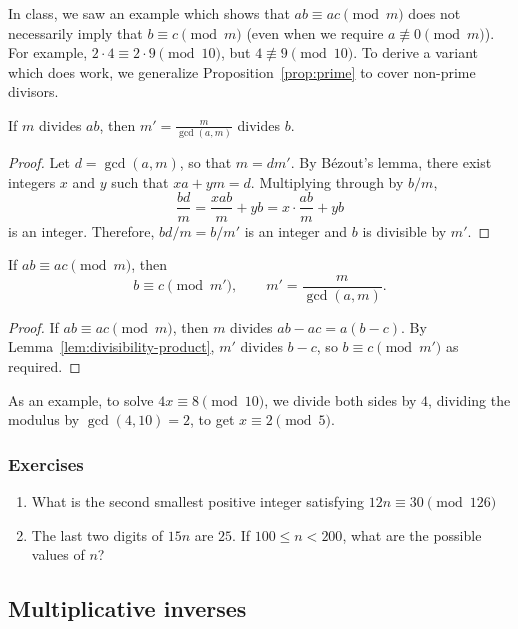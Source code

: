 In class, we saw an example which shows that $ab\equiv ac\pmod{m}$ does not necessarily imply that $b\equiv c\pmod{m}$ (even when we require $a\not\equiv 0\pmod{m}$). For example, $2\cdot 4\equiv 2\cdot 9\pmod{10}$, but $4\not\equiv 9\pmod{10}$. To derive a variant which does work, we generalize Proposition~\ref{prop:prime} to cover non-prime divisors.

\begin{lemma}\label{lem:divisibility-product}
If $m$ divides $ab$, then $m' = \frac{m}{\gcd(a,m)}$ divides $b$.
\end{lemma}
\begin{proof}
Let $d = \gcd(a,m)$, so that $m = dm'$. By B\'{e}zout's lemma, there exist integers $x$ and $y$ such that $xa + ym = d$. Multiplying through by $b/m$,
\begin{equation*}
\frac{bd}{m} = \frac{xab}{m} + yb = x\cdot\frac{ab}{m} + yb
\end{equation*}
is an integer. Therefore, $bd/m = b/m'$ is an integer and $b$ is divisible by $m'$.
\end{proof}

\begin{proposition}\label{prop:mod-arith-divide}
If $ab\equiv ac\pmod{m}$, then
\begin{equation*}
b\equiv c\pmod{m'},\qquad m' = \frac{m}{\gcd(a,m)}.
\end{equation*}
\end{proposition}
\begin{proof}
If $ab\equiv ac\pmod{m}$, then $m$ divides $ab - ac = a(b - c)$. By Lemma~\ref{lem:divisibility-product}, $m'$ divides $b - c$, so $b\equiv c\pmod{m'}$ as required.
\end{proof}

As an example, to solve $4x\equiv 8\pmod{10}$, we divide both sides by $4$, dividing the modulus by $\gcd(4,10) = 2$, to get $\boxed{x\equiv 2\pmod{5}}$.

\subsubsection*{Exercises}

\begin{enumerate}
\item What is the second smallest positive integer satisfying $12n\equiv 30\pmod{126}$
\item The last two digits of $15n$ are $25$. If $100\leq n < 200$, what are the possible values of $n$?
\end{enumerate}


\subsection{Multiplicative inverses}